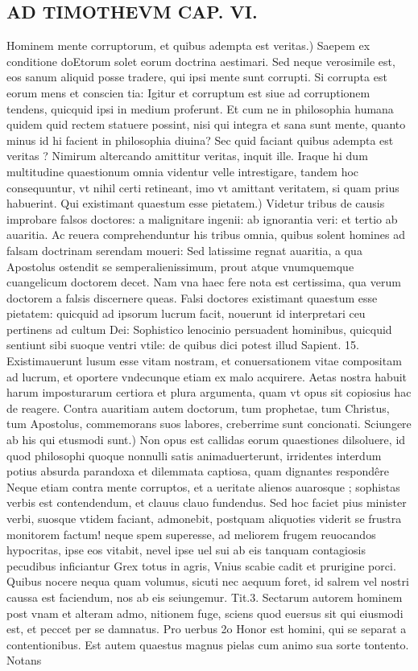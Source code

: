 \documentclass{article}
\begin{document}
\begin{pages}
\section*{AD TIMOTHEVM CAP. VI. }
\marginpar{[ p.123 ]}\pstart Hominem mente corruptorum, et quibus adempta est veritas.) Saepem ex conditione doEtorum solet eorum doctrina aestimari. Sed neque verosimile est, eos sanum aliquid posse tradere, qui ipsi mente sunt corrupti. Si corrupta est eorum mens et conscien tia: Igitur et corruptum est siue ad corruptionem tendens, quicquid ipsi in medium proferunt. Et cum ne in philosophia humana quidem quid rectem statuere possint, nisi qui integra et sana sunt mente, quanto minus id hi facient in philosophia diuina? Sec quid faciant quibus adempta est veritas ? Nimirum altercando amittitur veritas, inquit ille. Iraque hi dum multitudine quaestionum omnia videntur velle intrestigare, tandem hoc consequuntur, vt nihil certi retineant, imo vt amittant veritatem, si quam prius habuerint.  \pend\pstart Qui existimant quaestum esse pietatem.) Videtur tribus de causis improbare falsos doctores: a malignitare ingenii: ab ignorantia veri: et tertio ab auaritia. Ac reuera comprehenduntur his tribus omnia, quibus solent homines ad falsam doctrinam serendam moueri: Sed latissime regnat auaritia, a qua Apostolus ostendit se semperalienissimum, prout atque vnumquemque cuangelicum doctorem decet. Nam vna haec fere nota est certissima, qua verum doctorem a falsis discernere queas. Falsi doctores existimant quaestum esse pietatem: quicquid ad ipsorum lucrum facit, nouerunt id interpretari ceu pertinens ad cultum Dei: Sophistico lenocinio persuadent hominibus, quicquid sentiunt sibi suoque ventri vtile: de quibus dici potest illud Sapient. 15. Existimauerunt lusum esse vitam nostram, et conuersationem vitae compositam ad lucrum, et oportere vndecunque etiam ex malo acquirere. Aetas nostra habuit harum imposturarum certiora et plura argumenta, quam vt opus sit copiosius hac de reagere. Contra auaritiam autem doctorum, tum prophetae, tum Christus, tum Apostolus, commemorans suos labores, creberrime sunt concionati.  \pend\pstart Sciungere ab his qui etusmodi sunt.) Non opus est callidas eorum quaestiones dilsoluere, id quod philosophi quoque nonnulli satis animaduerterunt, irridentes interdum potius absurda parandoxa et dilemmata captiosa, quam dignantes respondêre Neque etiam contra mente corruptos, et a ueritate alienos auarosque ; sophistas verbis est contendendum, et clauus clauo fundendus. Sed hoc faciet pius minister verbi, suosque vtidem faciant, admonebit, postquam aliquoties viderit se frustra monitorem factum! neque spem superesse, ad meliorem frugem reuocandos hypocritas, ipse eos vitabit, nevel ipse uel sui ab eis tanquam contagiosis pecudibus inficiantur Grex totus in agris, Vnius scabie cadit et prurigine porci. Quibus nocere nequa quam volumus, sicuti nec aequum foret, id salrem vel nostri caussa est faciendum, nos ab eis seiungemur. Tit.3. Sectarum autorem hominem post vnam et alteram admo, nitionem fuge, sciens quod euersus sit qui eiusmodi est, et peccet per se damnatus. Pro uerbus 2o Honor est homini, qui se separat a contentionibus.  \pend\pstart Est autem quaestus magnus pielas cum animo sua sorte tontento. Notans 
\end{pages}
\end{document}
